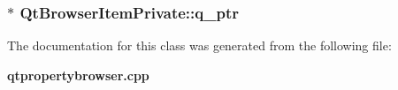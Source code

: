 \subsubsection[{q\+\_\+ptr}]{$\ast$ Qt\+Browser\+Item\+Private\+::q\+\_\+ptr}\label{classQtBrowserItemPrivate_a38d163bf6b10056793b39613b71c66b3}


The documentation for this class was generated from the following file\+:\begin{DoxyCompactItemize}
\item 
{\bf qtpropertybrowser.\+cpp}\end{DoxyCompactItemize}
